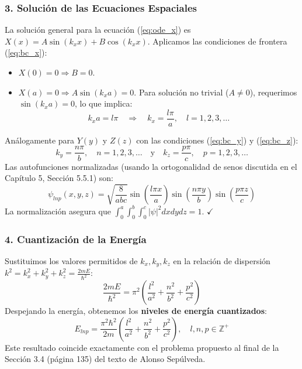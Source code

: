 \documentclass[a4paper]{article}
\begin{document}
\subsubsection{3. Solución de las Ecuaciones Espaciales}

La solución general para la ecuación (\ref{eq:ode_x}) es $X(x) = A \sin(k_x x) + B \cos(k_x x)$. Aplicamos las condiciones de frontera (\ref{eq:bc_x}):
\begin{itemize}
    \item $X(0) = 0 \Rightarrow B = 0$.
    \item $X(a) = 0 \Rightarrow A \sin(k_x a) = 0$. Para solución no trivial ($A \neq 0$), requerimos $\sin(k_x a) = 0$, lo que implica:
    \begin{equation}
    k_x a = l\pi \quad \Rightarrow \quad k_x = \frac{l\pi}{a}, \quad l = 1, 2, 3, \dots
    \end{equation}
\end{itemize}
Análogamente para $Y(y)$ y $Z(z)$ con las condiciones (\ref{eq:bc_y}) y (\ref{eq:bc_z}):
\begin{equation}
k_y = \frac{n\pi}{b}, \quad n = 1, 2, 3, \dots \quad \text{y} \quad k_z = \frac{p\pi}{c}, \quad p = 1, 2, 3, \dots
\end{equation}
Las autofunciones normalizadas (usando la ortogonalidad de senos discutida en el Capítulo 5, Sección 5.5.1) son:
\begin{equation}
\psi_{lnp}(x, y, z) = \sqrt{\frac{8}{abc}} \sin\left(\frac{l\pi x}{a}\right) \sin\left(\frac{n\pi y}{b}\right) \sin\left(\frac{p\pi z}{c}\right)
\end{equation}
La normalización asegura que $\int_0^a \int_0^b \int_0^c |\psi|^2 dx dy dz = 1$. $\checkmark$

\subsubsection{4. Cuantización de la Energía}

Sustituimos los valores permitidos de $k_x, k_y, k_z$ en la relación de dispersión $k^2 = k_x^2 + k_y^2 + k_z^2 = \frac{2mE}{\hbar^2}$:
\begin{equation}
\frac{2mE}{\hbar^2} = \pi^2 \left( \frac{l^2}{a^2} + \frac{n^2}{b^2} + \frac{p^2}{c^2} \right)
\end{equation}
Despejando la energía, obtenemos los \textbf{niveles de energía cuantizados}:
\begin{equation}
\boxed{E_{lnp} = \frac{\pi^2 \hbar^2}{2m} \left( \frac{l^2}{a^2} + \frac{n^2}{b^2} + \frac{p^2}{c^2} \right)}, \quad l, n, p \in \mathbb{Z}^+
\end{equation}
Este resultado coincide exactamente con el problema propuesto al final de la Sección 3.4 (página 135) del texto de Alonso Sepúlveda.
\end{document}
